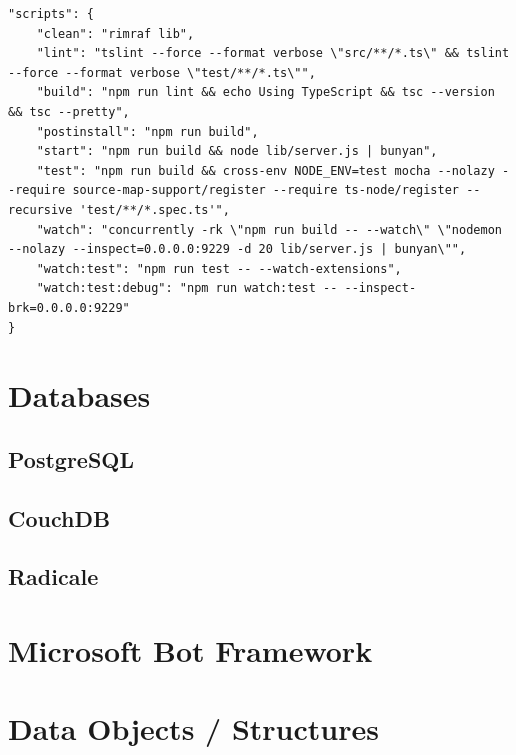 \begin{verbatim}
"scripts": {
    "clean": "rimraf lib",
    "lint": "tslint --force --format verbose \"src/**/*.ts\" && tslint --force --format verbose \"test/**/*.ts\"",
    "build": "npm run lint && echo Using TypeScript && tsc --version && tsc --pretty",
    "postinstall": "npm run build",
    "start": "npm run build && node lib/server.js | bunyan",
    "test": "npm run build && cross-env NODE_ENV=test mocha --nolazy --require source-map-support/register --require ts-node/register --recursive 'test/**/*.spec.ts'",
    "watch": "concurrently -rk \"npm run build -- --watch\" \"nodemon --nolazy --inspect=0.0.0.0:9229 -d 20 lib/server.js | bunyan\"",
    "watch:test": "npm run test -- --watch-extensions",
    "watch:test:debug": "npm run watch:test -- --inspect-brk=0.0.0.0:9229"
}
\end{verbatim}
\section{Databases}
\subsection{PostgreSQL}
\subsection{CouchDB} %
\subsection{Radicale}

\section{Microsoft Bot Framework}

\section{Data Objects / Structures}
